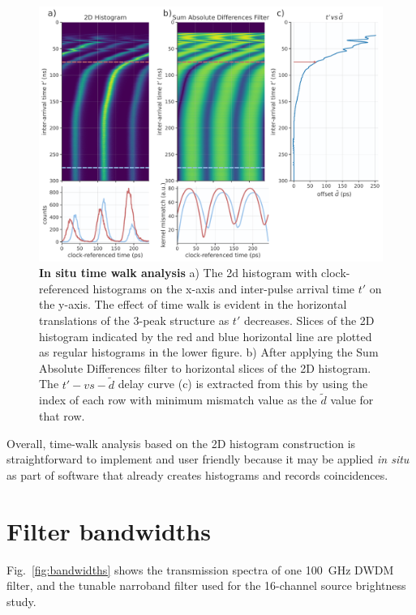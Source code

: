 \documentclass[11pt]{caltech_thesis} %
\begin{document}
\hypertarget{fig:time_walk}{%
\begin{figure}
\centering
\includegraphics[width=1\textwidth,height=\textheight]{./chapter_05/figs/time_walk_analysis_light.pdf}
\caption[{In situ time walk analysis}]{\textbf{In situ time walk analysis} a) The 2d histogram with clock-referenced histograms on the x-axis and inter-pulse arrival time $t'$ on the y-axis. The effect of time walk is evident in the horizontal translations of the 3-peak structure as $t'$ decreases. Slices of the 2D histogram indicated by the red and blue horizontal line are plotted as regular histograms in the lower figure. b) After applying the Sum Absolute Differences filter to horizontal slices of the 2D histogram. The $t'-vs-\tilde{d}$ delay curve (c) is extracted from this by using the index of each row with minimum mismatch value as the $\tilde{d}$ value for that row.}
\label{fig:time_walk}
\end{figure}
}

Overall, time-walk analysis based on the 2D histogram construction is straightforward to implement and user friendly because it may be applied \textit{in situ} as part of software that already creates histograms and records coincidences.

\hypertarget{filter-bandwidths}{%
\section{Filter bandwidths}\label{filter-bandwidths}}

Fig.~\ref{fig:bandwidths} shows the transmission spectra of one 100~GHz DWDM filter, and the tunable narroband filter used for the 16-channel source brightness study.
\end{document}
